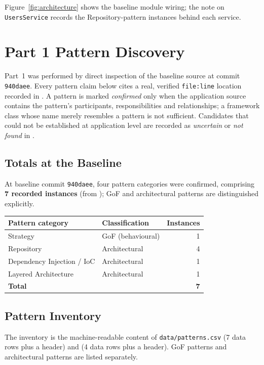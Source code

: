 \documentclass[11pt,a4paper]{article}
\begin{document}
Figure~\ref{fig:architecture} shows the baseline module wiring; the note on
\texttt{UsersService} records the Repository-pattern instances behind each
service.

\section{Part 1 Pattern Discovery}
Part~1 was performed by direct inspection of the baseline source at commit
\texttt{940daee}. Every pattern claim below cites a real, verified
\texttt{file:line} location recorded in
. A pattern is marked
\emph{confirmed} only when the application source contains the pattern's
participants, responsibilities and relationships; a framework class whose name
merely resembles a pattern is not sufficient. Candidates that could not be
established at application level are recorded as \emph{uncertain} or
\emph{not found} in .

\subsection{Totals at the Baseline}
\begin{sloppypar}
At baseline commit \texttt{940daee}, four pattern categories were confirmed,
comprising \textbf{7 recorded instances} (from
); GoF and architectural patterns are
distinguished explicitly.
\end{sloppypar}

\begin{center}
\begin{tabular}{l l r}
\toprule
Pattern category & Classification & Instances \\
\midrule
Strategy & GoF (behavioural) & 1 \\
Repository & Architectural & 4 \\
Dependency Injection / IoC & Architectural & 1 \\
Layered Architecture & Architectural & 1 \\
\midrule
\textbf{Total} & & \textbf{7} \\
\bottomrule
\end{tabular}
\end{center}

\subsection{Pattern Inventory}
The inventory is the machine-readable content of \texttt{data/patterns.csv}
(7 data rows plus a header) and  (4 data rows
plus a header). GoF patterns and architectural patterns are listed separately.
\end{document}

